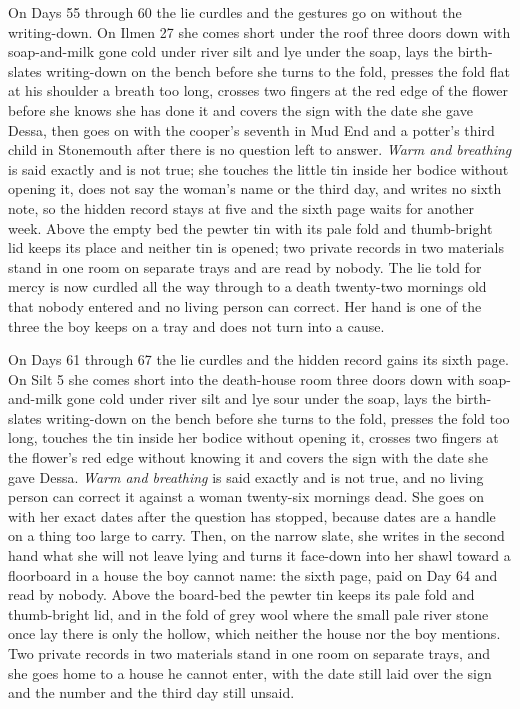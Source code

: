 \documentclass{design/chronicle}
\begin{document}
{On Days 55 through 60 the lie curdles and the gestures go on without the writing-down. On Ilmen 27 she comes short under the roof three doors down with soap-and-milk gone cold under river silt and lye under the soap, lays the birth-slates writing-down on the bench before she turns to the fold, presses the fold flat at his shoulder a breath too long, crosses two fingers at the red edge of the flower before she knows she has done it and covers the sign with the date she gave Dessa, then goes on with the cooper’s seventh in Mud End and a potter’s third child in Stonemouth after there is no question left to answer. \emph{Warm and breathing} is said exactly and is not true; she touches the little tin inside her bodice without opening it, does not say the woman’s name or the third day, and writes no sixth note, so the hidden record stays at five and the sixth page waits for another week. Above the empty bed the pewter tin with its pale fold and thumb-bright lid keeps its place and neither tin is opened; two private records in two materials stand in one room on separate trays and are read by nobody. The lie told for mercy is now curdled all the way through to a death twenty-two mornings old that nobody entered and no living person can correct. Her hand is one of the three the boy keeps on a tray and does not turn into a cause.

On Days 61 through 67 the lie curdles and the hidden record gains its sixth page. On Silt 5 she comes short into the death-house room three doors down with soap-and-milk gone cold under river silt and lye sour under the soap, lays the birth-slates writing-down on the bench before she turns to the fold, presses the fold too long, touches the tin inside her bodice without opening it, crosses two fingers at the flower’s red edge without knowing it and covers the sign with the date she gave Dessa. \emph{Warm and breathing} is said exactly and is not true, and no living person can correct it against a woman twenty-six mornings dead. She goes on with her exact dates after the question has stopped, because dates are a handle on a thing too large to carry. Then, on the narrow slate, she writes in the second hand what she will not leave lying and turns it face-down into her shawl toward a floorboard in a house the boy cannot name: the sixth page, paid on Day 64 and read by nobody. Above the board-bed the pewter tin keeps its pale fold and thumb-bright lid, and in the fold of grey wool where the small pale river stone once lay there is only the hollow, which neither the house nor the boy mentions. Two private records in two materials stand in one room on separate trays, and she goes home to a house he cannot enter, with the date still laid over the sign and the number and the third day still unsaid.

}
\end{document}
